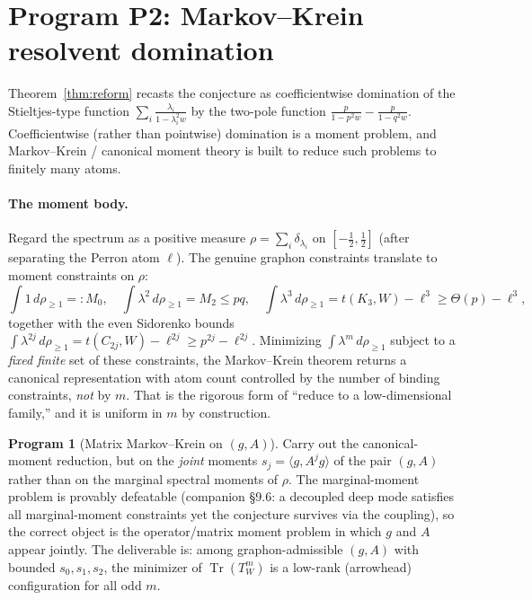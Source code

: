 \documentclass[11pt]{article}
\theoremstyle{definition}
\newtheorem{program}[theorem]{Program}
\newcommand{\Tr}{\operatorname{Tr}}
\newcommand{\1}{\mathbf{1}}
\begin{document}
\section{Program P2: Markov--Krein resolvent domination}\label{sec:markov}

Theorem~\ref{thm:reform} recasts the conjecture as coefficientwise domination of
the Stieltjes-type function $\sum_i\frac{\lambda_i}{1-\lambda_i^2w}$ by the
two-pole function $\frac{p}{1-p^2w}-\frac{p}{1-q^2w}$. Coefficientwise (rather
than pointwise) domination is a moment problem, and Markov--Krein / canonical
moment theory is built to reduce such problems to finitely many atoms.

\paragraph{The moment body.}
Regard the spectrum as a positive measure $\rho=\sum_i\delta_{\lambda_i}$ on
$[-\tfrac12,\tfrac12]$ (after separating the Perron atom $\ell$). The genuine
graphon constraints translate to moment constraints on $\rho$:
\[
\textstyle\int 1\,d\rho_{\ge1}=:M_0,\quad \int\lambda^2\,d\rho_{\ge1}=M_2\le pq,
\quad \int\lambda^3\,d\rho_{\ge1}=t(K_3,W)-\ell^3\ge\Theta(p)-\ell^3,
\]
together with the even Sidorenko bounds
$\int\lambda^{2j}\,d\rho_{\ge1}=t(C_{2j},W)-\ell^{2j}\ge p^{2j}-\ell^{2j}$.
Minimizing $\int\lambda^{m}\,d\rho_{\ge1}$ subject to a \emph{fixed finite} set
of these constraints, the Markov--Krein theorem returns a canonical
representation with atom count controlled by the number of binding constraints,
\emph{not} by $m$. That is the rigorous form of ``reduce to a low-dimensional
family,'' and it is uniform in $m$ by construction.

\begin{program}[Matrix Markov--Krein on $(g,A)$]\label{prog:mk}
Carry out the canonical-moment reduction, but on the \emph{joint} moments
$s_j=\langle g,A^jg\rangle$ of the pair $(g,A)$ rather than on the marginal
spectral moments of $\rho$. The marginal-moment problem is provably defeatable
(companion \S9.6: a decoupled deep mode satisfies all marginal-moment
constraints yet the conjecture survives via the coupling), so the correct object
is the operator/matrix moment problem in which $g$ and $A$ appear jointly. The
deliverable is: among graphon-admissible $(g,A)$ with bounded $s_0,s_1,s_2$, the
minimizer of $\Tr(T_W^m)$ is a low-rank (arrowhead) configuration for all odd $m$.
\end{program}
\end{document}
